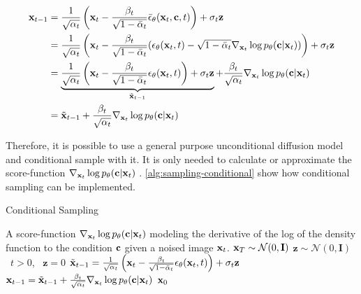 \begin{equation}
   \begin{aligned}
      \mathbf{x}_{t-1} &= \frac{1}{\sqrt{\alpha_t}} \left(\mathbf{x}_t - \frac{\beta_t}{\sqrt{1 - \bar{\alpha}_t}} \bar{\epsilon}_\theta(\mathbf{x}_t, \mathbf{c}, t) \right) + \sigma_t \mathbf{z} \\
      &= \frac{1}{\sqrt{\alpha_t}} \left(\mathbf{x}_t - \frac{\beta_t}{\sqrt{1 - \bar{\alpha}_t}} (\epsilon_\theta(\mathbf{x}_t, t) - \sqrt{1 - \bar{\alpha}_t} \nabla_{\mathbf{x}_t} \log p_\theta(\mathbf{c}|\mathbf{x}_t)) \right) + \sigma_t \mathbf{z} \\
      &= \underbrace{\frac{1}{\sqrt{\alpha_t}} \left(\mathbf{x}_t - \frac{\beta_t}{\sqrt{1 - \bar{\alpha}_t}} \epsilon_\theta(\mathbf{x}_t, t) \right) + \sigma_t \mathbf{z}}_{\tilde{\mathbf{x}}_{t-1}} + \frac{\beta_t}{\sqrt{\alpha_t}} \nabla_{\mathbf{x}_t} \log p_\theta(\mathbf{c}|\mathbf{x}_t) \\
      &= \tilde{\mathbf{x}}_{t-1} + \frac{\beta_t}{\sqrt{\alpha_t}} \nabla_{\mathbf{x}_t} \log p_\theta(\mathbf{c}|\mathbf{x}_t) \\
   \end{aligned}
\end{equation}

Therefore, it is possible to use a general purpose unconditional diffusion model and conditional sample with it.
It is only needed to calculate or approximate the score-function $\nabla_{\mathbf{x}_t} \log p_\theta(\mathbf{c}|\mathbf{x}_t)$ \parencite{diffusion-beats-gans}.
\autoref{alg:sampling-conditional} show how conditional sampling can be implemented.

\begin{algorithm}[htp!]
   \caption{Conditional Sampling}
   \label{alg:sampling-conditional}
   \begin{algorithmic}
      \Require A score-function $\nabla_{\mathbf{x}_t} \log p_\theta(\mathbf{c}|\mathbf{x}_t)$ modeling the derivative of the log of the density function to the condition $\mathbf{c}$ given a noised image $\mathbf{x}_t$.
      \State $\mathbf{x}_T \sim \mathcal{N}(0, \mathbf{I})$
      \State $\mathbf{z} \sim \mathcal{N}(0, \mathbf{I})$ \algorithmicif\ $t > 0$, \algorithmicelse\ $\mathbf{z} = 0$
      \State $\tilde{\mathbf{x}}_{t-1} = \frac{1}{\sqrt{\alpha_t}} \left(\mathbf{x}_t - \frac{\beta_t}{\sqrt{1 - \bar{\alpha}_t}} \epsilon_\theta(\mathbf{x}_t, t) \right) + \sigma_t \mathbf{z}$
      \State $\mathbf{x}_{t-1} = \tilde{\mathbf{x}}_{t-1} + \frac{\beta_t}{\sqrt{\alpha_t}} \nabla_{\mathbf{x}_t} \log p_\theta(\mathbf{c}|\mathbf{x}_t)$
      \EndFor
      \Return $\mathbf{x}_0$
   \end{algorithmic}
\end{algorithm}

